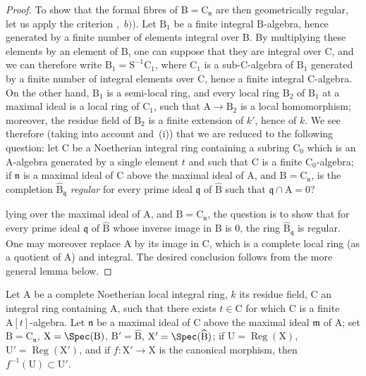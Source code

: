 \begin{proof}
To show that the formal fibres of $\mathrm{B}=\mathrm{C}_\mathfrak{n}$ are then geometrically regular, let us apply the criterion ,~$b)$).
Let $\mathrm{B}_1$ be a finite integral $\mathrm{B}$-algebra, hence generated by a finite number of elements integral over $\mathrm{B}$.
By multiplying these elements by an element of $\mathrm{B}$, one can suppose that they are integral over $\mathrm{C}$, and we can therefore write $\mathrm{B}_1=\mathrm{S}^{-1}\mathrm{C}_1$, where $\mathrm{C}_1$ is a sub-C-algebra of $\mathrm{B}_1$ generated by a finite number of integral elements over $\mathrm{C}$, hence a finite integral C-algebra.
On the other hand, $\mathrm{B}_1$ is a semi-local ring, and every local ring $\mathrm{B}_2$ of $\mathrm{B}_1$ at a maximal ideal is a local ring of $\mathrm{C}_1$, such that $\mathrm{A}\to\mathrm{B}_2$ is a local homomorphism; moreover, the residue field of $\mathrm{B}_2$ is a finite extension of $k'$, hence of $k$.
We see therefore (taking into account  and~(i)) that we are reduced to the following question: let $\mathrm{C}$ be a Noetherian integral ring containing a subring $\mathrm{C}_0$ which is an $\mathrm{A}$-algebra generated by a single element $t$ and such that $\mathrm{C}$ is a finite $\mathrm{C}_0$-algebra; if $\mathfrak{n}$ is a maximal ideal of $\mathrm{C}$
above the maximal ideal of $\mathrm{A}$, and $\mathrm{B}=\mathrm{C}_\mathfrak{n}$, is the completion $\widehat{\mathrm{B}}_\mathfrak{q}$ \emph{regular} for every prime ideal $\mathfrak{q}$ of $\widehat{\mathrm{B}}$ such that $\mathfrak{q}\cap\mathrm{A}=0$?

lying over the maximal ideal of $\mathrm{A}$, and $\mathrm{B}=\mathrm{C}_\mathfrak{n}$, the question is to show that for every prime ideal $\mathfrak{q}$ of $\widehat{\mathrm{B}}$ whose inverse image in $\mathrm{B}$ is $0$, the ring $\widehat{\mathrm{B}}_\mathfrak{q}$ is regular.
One may moreover replace $\mathrm{A}$ by its image in $\mathrm{C}$, which is a complete local ring (as a quotient of $\mathrm{A}$) and integral. The desired conclusion follows from the more general lemma below.
\end{proof}

\begin{lemma}[7.4.4.2]
\label{IV.7.4.4.2}
Let $\mathrm{A}$ be a complete Noetherian local integral ring, $k$ its residue field, $\mathrm{C}$ an integral ring containing $\mathrm{A}$, such that there exists $t\in\mathrm{C}$ for which $\mathrm{C}$ is a finite $\mathrm{A}[t]$-algebra.
Let $\mathfrak{n}$ be a maximal ideal of $\mathrm{C}$ above the maximal ideal $\mathfrak{m}$ of $\mathrm{A}$; set $\mathrm{B}=\mathrm{C}_\mathfrak{n}$, $\mathrm{X}=\Spec(\mathrm{B})$, $\mathrm{B}'=\widehat{\mathrm{B}}$, $\mathrm{X}'=\Spec(\widehat{\mathrm{B}})$; if $\mathrm{U}=\operatorname{Reg}(\mathrm{X})$, $\mathrm{U}'=\operatorname{Reg}(\mathrm{X}')$, and if $f:\mathrm{X}'\to\mathrm{X}$ is the canonical morphism, then $f^{-1}(\mathrm{U})\subset\mathrm{U}'$.
\end{lemma}

